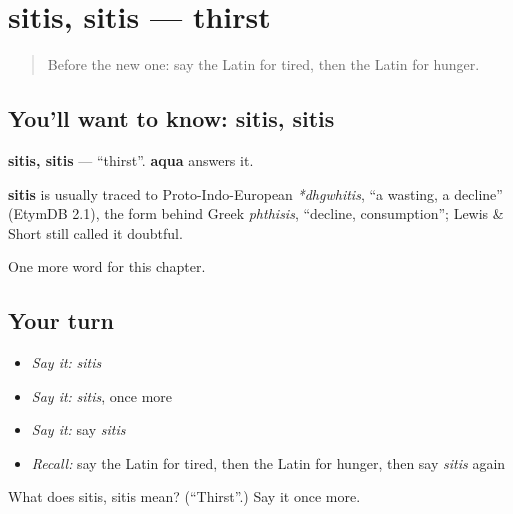 \section[sitis, sitis]{sitis, sitis — thirst}

\label{lesson:LA-C68-sitis}



\begin{quote}
Before the new one: say the Latin for tired, then the Latin for hunger.
\end{quote}

\subsection*{You'll want to know: sitis, sitis}
\textbf{sitis, sitis} — \textquotedblleft{}thirst\textquotedblright{}. \textbf{aqua} answers it.

\begin{cousinweb}
\textbf{sitis} is usually traced to Proto-Indo-European \emph{*dhgwhitis}, \textquotedblleft{}a wasting, a decline\textquotedblright{} (EtymDB 2.1), the form behind Greek \emph{phthisis}, \textquotedblleft{}decline, consumption\textquotedblright{}; Lewis \& Short still called it doubtful.
\end{cousinweb}

\begin{grammarlens}[title={What you've built}]
One more word for this chapter.
\end{grammarlens}

\subsection*{Your turn}
\begin{itemize}
\raggedright
  \item \emph{Say it:} \emph{sitis}
  \item \emph{Say it:} \emph{sitis}, once more
  \item \emph{Say it:} say \emph{sitis}
  \item \emph{Recall:} say the Latin for tired, then the Latin for hunger, then say \emph{sitis} again
\end{itemize}

\begin{tcolorbox}[breakable,colback=teal!4,colframe=teal!35!black,title={Before you move on}]
What does sitis, sitis mean? (\textquotedblleft{}Thirst\textquotedblright{}.) Say it once more.
\end{tcolorbox}
